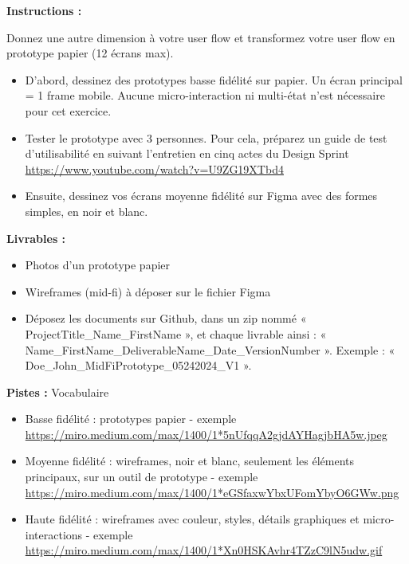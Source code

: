 \makeheaderfiles

\textbf{Instructions :}

Donnez une autre dimension à votre user flow et transformez votre user flow en prototype papier (12 écrans max).

\begin{itemize}
\item D'abord, dessinez des prototypes basse fidélité sur papier. Un écran principal = 1 frame mobile. Aucune micro-interaction ni multi-état n'est nécessaire pour cet exercice.
\item Tester le prototype avec 3 personnes. Pour cela, préparez un guide de test d'utilisabilité en suivant l'entretien en cinq actes du Design Sprint \url{https://www.youtube.com/watch?v=U9ZG19XTbd4}
\item Ensuite, dessinez vos écrans moyenne fidélité sur Figma avec des formes simples, en noir et blanc.
\end{itemize}

\textbf{Livrables :}

\begin{itemize}
\item Photos d'un prototype papier
\item Wireframes (mid-fi) à déposer sur le fichier Figma
\item Déposez les documents sur Github, dans un zip nommé « ProjectTitle\_Name\_FirstName », et chaque livrable ainsi : « Name\_FirstName\_DeliverableName\_Date\_VersionNumber ». Exemple : « Doe\_John\_MidFiPrototype\_05242024\_V1 ».
\end{itemize}

\textbf{Pistes :} Vocabulaire

\begin{itemize}
\item Basse fidélité : prototypes papier - exemple \url{https://miro.medium.com/max/1400/1*5nUfqqA2gjdAYHagjbHA5w.jpeg}
\item Moyenne fidélité : wireframes, noir et blanc, seulement les éléments principaux, sur un outil de prototype - exemple \url{https://miro.medium.com/max/1400/1*eGSfaxwYbxUFomYbyO6GWw.png}
\item Haute fidélité : wireframes avec couleur, styles, détails graphiques et micro-interactions - exemple \url{https://miro.medium.com/max/1400/1*Xn0HSKAvhr4TZzC9lN5udw.gif}
\end{itemize}

